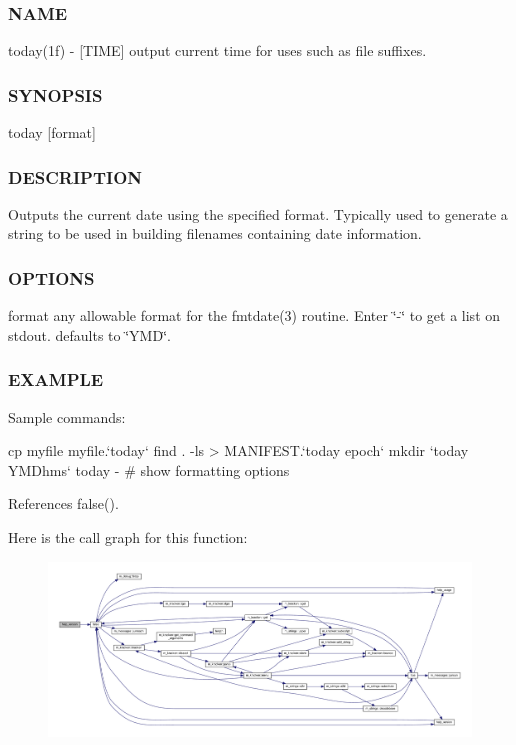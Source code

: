 \subsubsection*{N\+A\+ME}

today(1f) -\/ \mbox{[}T\+I\+ME\mbox{]} output current time for uses such as file suffixes. \subsubsection*{S\+Y\+N\+O\+P\+S\+IS}

today \mbox{[}format\mbox{]} \subsubsection*{D\+E\+S\+C\+R\+I\+P\+T\+I\+ON}

Outputs the current date using the specified format. Typically used to generate a string to be used in building filenames containing date information. \subsubsection*{O\+P\+T\+I\+O\+NS}

format any allowable format for the fmtdate(3) routine. Enter \char`\"{}-\/\char`\"{} to get a list on stdout. defaults to \char`\"{}\+Y\+M\+D\char`\"{}. \subsubsection*{E\+X\+A\+M\+P\+LE}

\begin{DoxyVerb}    Sample commands:

     cp myfile myfile.`today`
     find . -ls > MANIFEST.`today epoch`
     mkdir `today YMDhms`
     today -                              # show formatting options \end{DoxyVerb}
 

References false().

Here is the call graph for this function\+:
\nopagebreak
\begin{figure}[H]
\begin{center}
\leavevmode
\includegraphics[width=350pt]{today_8f90_a39c21619b08a3c22f19e2306efd7f766_cgraph}
\end{center}
\end{figure}
\mbox{\label{today_8f90_a85de40d003821f9db87243b8b25b8d40}} 
